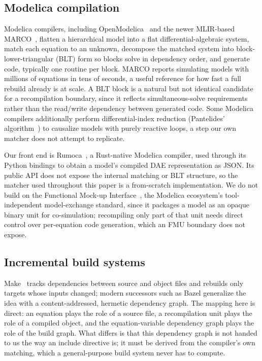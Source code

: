 \documentclass[journal]{IEEEtran}
\begin{document}
\subsection{Modelica compilation}

Modelica compilers, including OpenModelica~\cite{fritzson2005openmodelica} and the newer MLIR-based MARCO~\cite{agosta2023marco}, flatten a hierarchical model into a flat differential-algebraic system, match each equation to an unknown, decompose the matched system into block-lower-triangular (BLT) form so blocks solve in dependency order, and generate code, typically one routine per block. MARCO reports simulating models with millions of equations in tens of seconds, a useful reference for how fast a full rebuild already is at scale. A BLT block is a natural but not identical candidate for a recompilation boundary, since it reflects simultaneous-solve requirements rather than the read/write dependency between generated code. Some Modelica compilers additionally perform differential-index reduction (Pantelides' algorithm~\cite{pantelides1988consistent}) to causalize models with purely reactive loops, a step our own matcher does not attempt to replicate.

Our front end is Rumoca~\cite{condie2026rumoca}, a Rust-native Modelica compiler, used through its Python bindings to obtain a model's compiled DAE representation as JSON. Its public API does not expose the internal matching or BLT structure, so the matcher used throughout this paper is a from-scratch implementation. We do not build on the Functional Mock-up Interface~\cite{blochwitz2012fmi}, the Modelica ecosystem's tool-independent model-exchange standard, since it packages a model as an opaque binary unit for co-simulation; recompiling only part of that unit needs direct control over per-equation code generation, which an FMU boundary does not expose.

\subsection{Incremental build systems}

Make~\cite{feldman1979make} tracks dependencies between source and object files and rebuilds only targets whose inputs changed; modern successors such as Bazel generalize the idea with a content-addressed, hermetic dependency graph. The mapping here is direct: an equation plays the role of a source file, a recompilation unit plays the role of a compiled object, and the equation-variable dependency graph plays the role of the build graph. What differs is that this dependency graph is not handed to us the way an include directive is; it must be derived from the compiler's own matching, which a general-purpose build system never has to compute.
\end{document}
